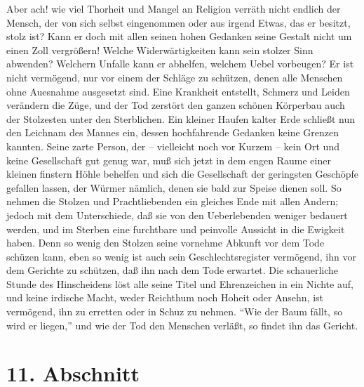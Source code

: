 Aber ach! wie viel Thorheit und Mangel an Religion verräth nicht endlich der Mensch, der von sich selbst eingenommen oder aus irgend Etwas, das er besitzt, stolz ist? Kann er doch mit allen seinen hohen Gedanken seine Gestalt nicht um einen Zoll vergrößern! Welche Widerwärtigkeiten kann sein stolzer Sinn abwenden? Welchern Unfalle kann er abhelfen, welchem Uebel vorbeugen? Er ist nicht vermögend, nur vor einem der Schläge zu schützen, denen alle Menschen ohne Auesnahme ausgesetzt sind. Eine Krankheit entstellt, Schmerz und Leiden verändern die Züge, und der Tod zerstört den ganzen schönen Körperbau auch der Stolzesten unter den Sterblichen. Ein kleiner Haufen kalter Erde schließt nun den Leichnam des Mannes ein, dessen hochfahrende Gedanken keine Grenzen kannten. Seine zarte Person, der -- vielleicht noch vor Kurzem -- kein Ort und keine Gesellschaft gut genug war, muß sich jetzt in dem engen Raume einer kleinen finstern Höhle behelfen und sich die Gesellschaft der geringsten Geschöpfe gefallen lassen, der Würmer nämlich, denen sie bald zur Speise dienen soll. So nehmen die Stolzen und Prachtliebenden ein gleiches Ende mit allen Andern; jedoch mit dem Unterschiede, daß sie von den Ueberlebenden weniger bedauert werden, und im Sterben eine furchtbare und peinvolle Aussicht in die Ewigkeit haben. Denn so wenig den Stolzen seine vornehme Abkunft vor dem Tode schüzen kann, eben so wenig ist auch sein Geschlechtsregister vermögend, ihn vor dem Gerichte zu schützen, daß ihn nach dem Tode erwartet. Die schauerliche Stunde des Hinscheidens löst alle seine Titel und Ehrenzeichen in ein Nichte auf, und keine irdische Macht, weder Reichthum noch Hoheit oder Ansehn, ist vermögend, ihn zu erretten oder in Schuz zu nehmen. "`Wie der Baum fällt, so wird er liegen,"' und wie der Tod den Menschen verläßt, so findet ihn das Gericht.

\section{11. Abschnitt}

